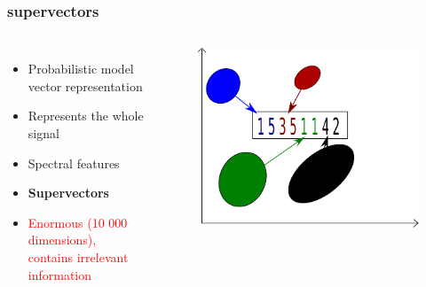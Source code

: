 \documentclass[11pt,english]{beamer}
\begin{document}
\begin{frame}
 \frametitle{supervectors}
  \begin{columns}
    \begin{itemize}
    \item Probabilistic model vector representation
    \item Represents the whole signal
    \item Spectral features
    \item \textbf{Supervectors}
    \item \textcolor{red}{Enormous (10 000 dimensions), contains irrelevant information}
    \end{itemize}
    \begin{figure}
        \centering
       \includegraphics[scale = 0.5]{supervectors.pdf}
      \end{figure}
  \end{columns}
\end{frame}
\end{document}
